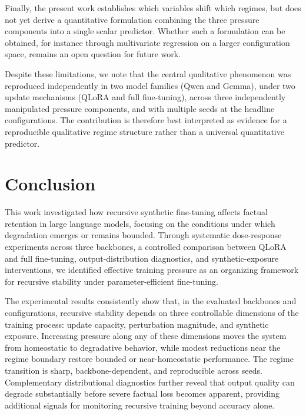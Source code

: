 \documentclass[a4paper,fleqn]{cas-dc}
\begin{document}
Finally, the present work establishes which variables shift which regimes,
but does not yet derive a quantitative formulation combining the three pressure
components into a single scalar predictor. Whether such a formulation can be
obtained, for instance through multivariate regression on a larger configuration
space, remains an open question for future work.

Despite these limitations, we note that the central qualitative phenomenon was
reproduced independently in two model families (Qwen and Gemma), under two
update mechanisms (QLoRA and full fine-tuning), across three independently
manipulated pressure components, and with multiple seeds at the headline
configurations. The contribution is therefore best interpreted as evidence for a
reproducible qualitative regime structure rather than a universal quantitative
predictor.

\section{Conclusion}\label{sec:conclusion}

This work investigated how recursive synthetic fine-tuning affects factual
retention in large language models, focusing on the conditions under which
degradation emerges or remains bounded. Through systematic dose-response
experiments across three backbones, a controlled comparison between QLoRA and
full fine-tuning, output-distribution diagnostics, and synthetic-exposure
interventions, we identified effective training pressure as an organizing
framework for recursive stability under parameter-efficient fine-tuning.

The experimental results consistently show that, in the evaluated backbones and
configurations, recursive stability depends on three controllable dimensions of
the training process: update capacity, perturbation magnitude, and synthetic
exposure. Increasing pressure along any of these dimensions moves the system
from homeostatic to degradative behavior, while modest reductions near the
regime boundary restore bounded or near-homeostatic performance. The regime
transition is sharp, backbone-dependent, and reproducible across seeds.
Complementary distributional diagnostics further reveal that output quality can
degrade substantially before severe factual loss becomes apparent, providing
additional signals for monitoring recursive training beyond accuracy alone.
\end{document}
